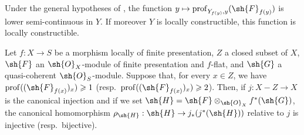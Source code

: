 
\begin{corollary}[19.9.7]
\label{IV.19.9.7}
Under the general hypotheses of , the function $y\mapsto\operatorname{prof}_{Y_{f(y)},y}(\sh{F}_{f(y)})$ is lower semi-continuous in $Y$.
If moreover $Y$ is locally constructible, this function is locally constructible.
\end{corollary}

\begin{proposition}[19.9.8]
\label{IV.19.9.8}
Let $f:X\to S$ be a morphism locally of finite presentation, $Z$ a closed subset of $X$, $\sh{F}$ an $\sh{O}_X$-module of finite presentation and $f$-flat, and $\sh{G}$ a quasi-coherent $\sh{O}_S$-module.
Suppose that, for every $x\in Z$, we have $\operatorname{prof}((\sh{F}_{f(x)})_x)\geqslant 1$ (resp.\ $\operatorname{prof}((\sh{F}_{f(x)})_x)\geqslant 2$).
Then, if $j:X-Z\to X$ is the canonical injection and if we set $\sh{H}=\sh{F}\otimes_{\sh{O}_X}f^*(\sh{G})$, the canonical homomorphism $\rho_{\sh{H}}:\sh{H}\to j_*(j^*(\sh{H}))$ relative to $j$ is injective (resp.\ bijective).
\end{proposition}

